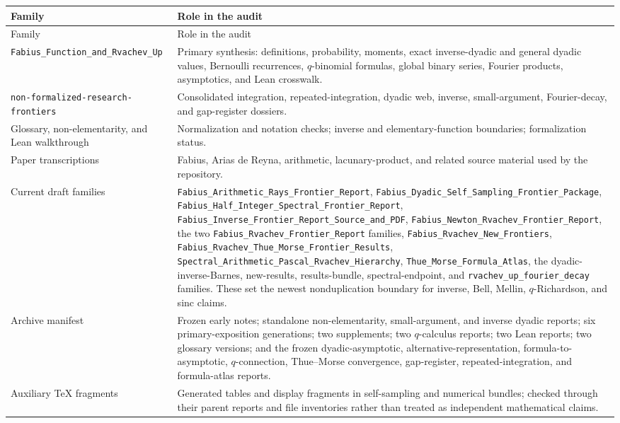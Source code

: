 \documentclass[11pt,oneside]{article}
\numberwithin{equation}{section}
\theoremstyle{definition}
\theoremstyle{remark}
\newcommand{\familyname}[1]{\nolinkurl{#1}}
\begin{document}
\begingroup\small
\begin{longtable}{@{}>{\raggedright\arraybackslash}p{}>{\raggedright\arraybackslash}p{}@{}}
\toprule
Family & Role in the audit \\
\midrule
\endfirsthead
\toprule
Family & Role in the audit \\
\midrule
\endhead
\familyname{Fabius_Function_and_Rvachev_Up} &
Primary synthesis: definitions, probability, moments, exact inverse-dyadic and
general dyadic values, Bernoulli recurrences, $q$-binomial formulas, global
binary series, Fourier products, asymptotics, and Lean crosswalk. \\
\familyname{non-formalized-research-frontiers} &
Consolidated integration, repeated-integration, dyadic web, inverse,
small-argument, Fourier-decay, and gap-register dossiers. \\
Glossary, non-elementarity, and Lean walkthrough &
Normalization and notation checks; inverse and elementary-function boundaries;
formalization status. \\
Paper transcriptions &
Fabius, Arias de Reyna, arithmetic, lacunary-product, and related source
material used by the repository. \\
Current draft families &
\familyname{Fabius_Arithmetic_Rays_Frontier_Report},
\familyname{Fabius_Dyadic_Self_Sampling_Frontier_Package},
\familyname{Fabius_Half_Integer_Spectral_Frontier_Report},
\familyname{Fabius_Inverse_Frontier_Report_Source_and_PDF},
\familyname{Fabius_Newton_Rvachev_Frontier_Report}, the two
\familyname{Fabius_Rvachev_Frontier_Report} families,
\familyname{Fabius_Rvachev_New_Frontiers},
\familyname{Fabius_Rvachev_Thue_Morse_Frontier_Results},
\familyname{Spectral_Arithmetic_Pascal_Rvachev_Hierarchy},
\familyname{Thue_Morse_Formula_Atlas}, the dyadic-inverse-Barnes,
new-results, results-bundle, spectral-endpoint, and
\familyname{rvachev_up_fourier_decay} families.  These set the newest
nonduplication boundary for inverse, Bell, Mellin, $q$-Richardson, and sinc
claims. \\
Archive manifest &
Frozen early notes; standalone non-elementarity, small-argument, and inverse
dyadic reports; six primary-exposition generations; two supplements; two
$q$-calculus reports; two Lean reports; two glossary versions; and the frozen
dyadic-asymptotic, alternative-representation, formula-to-asymptotic,
$q$-connection, Thue--Morse convergence, gap-register, repeated-integration,
and formula-atlas reports. \\
Auxiliary TeX fragments &
Generated tables and display fragments in self-sampling and numerical bundles;
checked through their parent reports and file inventories rather than treated
as independent mathematical claims. \\
\bottomrule
\end{longtable}
\endgroup
\end{document}
